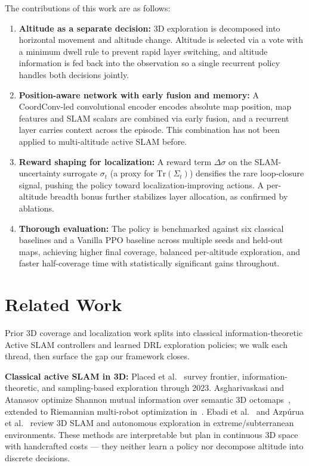 \documentclass[conference]{IEEEtran}
\begin{document}
The contributions of this work are as follows:
\begin{enumerate}
    \item \textbf{Altitude as a separate decision:} 3D exploration is decomposed into horizontal movement and altitude change. Altitude is selected via a vote with a minimum dwell rule to prevent rapid layer switching, and altitude information is fed back into the observation so a single recurrent policy handles both decisions jointly.
    \item \textbf{Position-aware network with early fusion and memory:} A CoordConv-led convolutional encoder encodes absolute map position, map features and SLAM scalars are combined via early fusion, and a recurrent layer carries context across the episode. This combination has not been applied to multi-altitude active SLAM before.
    \item \textbf{Reward shaping for localization:} A reward term $\Delta\sigma$ on the SLAM-uncertainty surrogate $\sigma_t$ (a proxy for $\mathrm{Tr}(\Sigma_t)$) densifies the rare loop-closure signal, pushing the policy toward localization-improving actions. A per-altitude breadth bonus further stabilizes layer allocation, as confirmed by ablations.
    \item \textbf{Thorough evaluation:} The policy is benchmarked against six classical baselines and a Vanilla PPO baseline across multiple seeds and held-out maps, achieving higher final coverage, balanced per-altitude exploration, and faster half-coverage time with statistically significant gains throughout.
\end{enumerate}

\section{Related Work}

Prior 3D coverage and localization work splits into classical information-theoretic Active SLAM controllers and learned DRL exploration policies; we walk each thread, then surface the gap our framework closes.

\textbf{Classical active SLAM in 3D:} Placed et al.~\cite{placed2023survey} survey frontier, information-theoretic, and sampling-based exploration through 2023. Asgharivaskasi and Atanasov optimize Shannon mutual information over semantic 3D octomaps~\cite{asgharivaskasi2023semantic}, extended to Riemannian multi-robot optimization in~\cite{asgharivaskasi2025riemannian}. Ebadi et al.~\cite{ebadi2023extreme} and Azp\'urua et al.~\cite{azpurua2023subterranean} review 3D SLAM and autonomous exploration in extreme/subterranean environments. These methods are interpretable but plan in continuous 3D space with handcrafted costs --- they neither learn a policy nor decompose altitude into discrete decisions.
\end{document}
